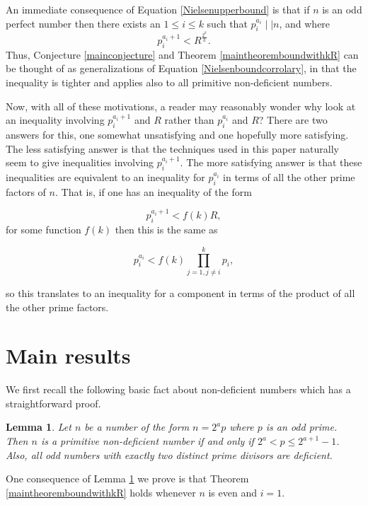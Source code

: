 \documentclass[12pt,reqno]{article}
\theoremstyle{plain}
\newtheorem{lemma}[theorem]{Lemma}
\theoremstyle{definition}
\theoremstyle{remark}
\begin{document}
An immediate consequence of Equation \eqref{Nielsenupperbound} is that if $n$ is an odd perfect number then there exists an $1 \leq i \leq k$ such that $p_i^{a_i} \mid \mid n$, and where
\begin{equation}
    p_i^{a_i+1} < R^{\frac{2^k}{k}}. \label{Nielsenboundcorrolary}
\end{equation}
Thus, Conjecture \ref{mainconjecture} and Theorem \ref{maintheoremboundwithkR} can be thought of as generalizations of Equation \eqref{Nielsenboundcorrolary}, in that the inequality is tighter and applies also to all primitive non-deficient numbers. 

Now, with all of these motivations, a reader may reasonably wonder why look at an inequality involving $p_i^{a_i+1}$ and $R$ rather than $p_i^{a_i}$ and $R$? There are two answers for this, one somewhat unsatisfying and one hopefully more satisfying. The less satisfying answer is that the techniques used in this paper naturally seem to give inequalities involving $p_i^{a_i+1}$. The more satisfying answer is that these inequalities are equivalent to an inequality for $p_i^{a_i}$ in terms of all the other prime factors of $n$. That is, if one has an inequality of the form

$$p_i^{a_i +1} < f(k)R,$$ for some function $f(k)$ then this is the same as 

$$p_i^{a_i} < f(k)\prod_{j=1, j\neq i}^{k} p_i,$$

so this translates to an inequality for a component in terms of the product of all the other prime factors.

\section{Main results}
We first recall the following basic fact about non-deficient numbers which has a straightforward proof. 
\begin{lemma} Let $n$ be a number of the form $n=2^ap$ where $p$ is an odd prime. Then $n$ is a primitive non-deficient number if and only if $2^a <p \leq 2^{a+1} -1$. Also, all odd numbers with exactly two distinct prime divisors are deficient.
\label{Classificationofprimitivenondeficientwhenkis2}
\end{lemma}
One consequence of Lemma \ref{Classificationofprimitivenondeficientwhenkis2} we prove is that Theorem \ref{maintheoremboundwithkR} holds whenever $n$ is even and $i=1$. 
\end{document}
